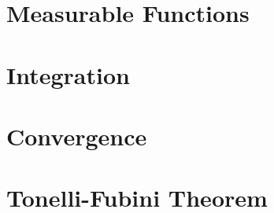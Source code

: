 \section{Measurable Functions}
\section{Integration}
\section{Convergence}
\section{Tonelli-Fubini Theorem}
